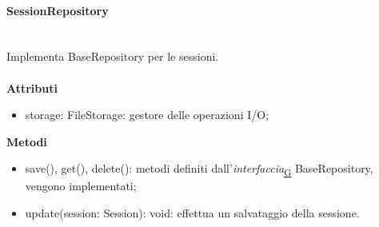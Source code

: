 \documentclass[a4paper,12pt]{article}
\begin{document}
                \paragraph{SessionRepository}\mbox{}\\
                    Implementa BaseRepository per le sessioni.\\\\
                    \textbf{Attributi}
                    \begin{itemize}
                        \item {\ttfamily storage: FileStorage}: gestore delle operazioni I/O;
                    \end{itemize}
                    \textbf{Metodi}
                    \begin{itemize}
                        \item {\ttfamily save(), get(), delete()}: metodi definiti dall'\textit{interfaccia}\textsubscript{\href{https://atlasteam9.github.io/Atlas/glossario.html\#Interfaccia}{G}} BaseRepository, vengono implementati;
                        \item {\ttfamily update(session: Session): void}: effettua un salvataggio della sessione.
                    \end{itemize}
\end{document}
